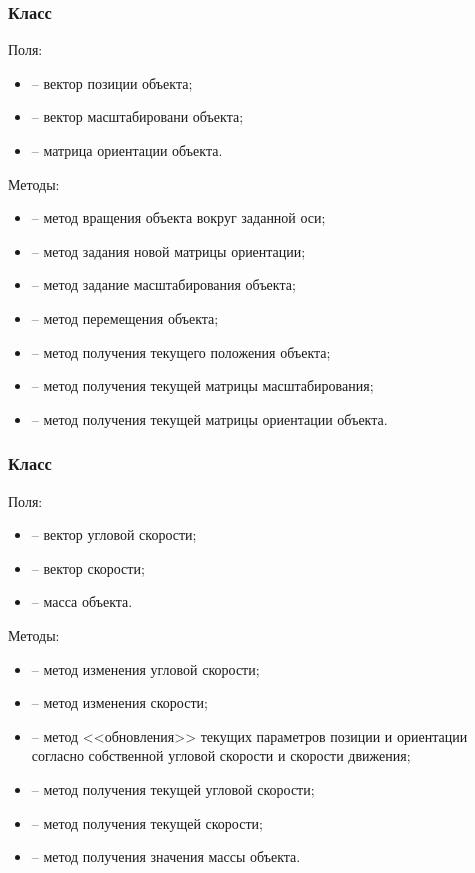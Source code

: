 \subsubsection{Класс }
\noindent\indent Поля:
\begin{itemize}
    \item {} -- вектор позиции объекта;
    \item {} -- вектор масштабировани объекта;
    \item {} -- матрица ориентации объекта.
\end{itemize}\par
    Методы:
\begin{itemize}
    \item {} -- метод вращения объекта
    вокруг заданной оси;
    \item {} -- метод задания новой матрицы
    ориентации;
    \item {} -- метод задание масштабирования объекта;
    \item {} -- метод перемещения объекта;
    \item {} -- метод получения текущего положения объекта;
    \item {} -- метод получения текущей матрицы масштабирования;
    \item {} -- метод получения текущей матрицы ориентации объекта.
\end{itemize}
\subsubsection{Класс }
\noindent\indent Поля:
\begin{itemize}
    \item {} -- вектор угловой скорости;
    \item {} -- вектор скорости;
    \item {} -- масса объекта.
\end{itemize}\par
    Методы:
\begin{itemize}
    \item {} -- метод изменения угловой скорости;
    \item {} -- метод изменения скорости;
    \item {} -- метод <<обновления>> текущих параметров позиции
    и ориентации согласно собственной угловой скорости и скорости движения;
    \item {} -- метод получения текущей угловой скорости;
    \item {} -- метод получения текущей скорости;
    \item {} -- метод получения значения массы объекта.
\end{itemize}
